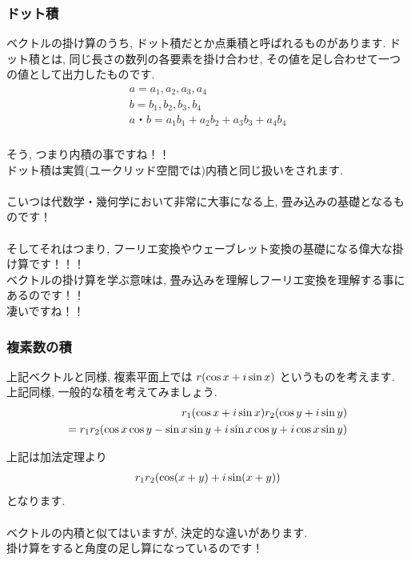 \documentclass[11pt,a4paper]{jreport}
\begin{document}
\subsubsection{ドット積}
ベクトルの掛け算のうち, ドット積だとか点乗積と呼ばれるものがあります.
ドット積とは, 同じ長さの数列の各要素を掛け合わせ, その値を足し合わせて一つの値として出力したものです.\\
\begin{eqnarray}
\begin{split}
a = {a_1,a_2,a_3,a_4}\\
b={b_1,b_2,b_3,b_4}\\
a・b = a_1b_1 + a_2b_2 + a_3b_3 + a_4b_4
\end{split}
\end{eqnarray}
\\
そう, つまり内積の事ですね！！\\
ドット積は実質(ユークリッド空間では)内積と同じ扱いをされます.\\
\\
こいつは代数学・幾何学において非常に大事になる上, 畳み込みの基礎となるものです！\\
\\
そしてそれはつまり, フーリエ変換やウェーブレット変換の基礎になる偉大な掛け算です！！！
\\
ベクトルの掛け算を学ぶ意味は, 畳み込みを理解しフーリエ変換を理解する事にあるのです！！\\
凄いですね！！\\

\subsubsection{複素数の積}
上記ベクトルと同様, 複素平面上では $\mathstrut r (\cos x + \mathstrut i\sin x)$ というものを考えます.\\
上記同様, 一般的な積を考えてみましょう.\\

\begin{eqnarray}
\begin{split}
\mathstrut r_1(\cos x + \mathstrut i\sin x)\mathstrut r_2(\cos y + \mathstrut i\sin y)\\
= \mathstrut r_1\mathstrut r_2(\cos x\cos y - \sin x\sin y + \mathstrut i\sin x \cos y + \mathstrut i\cos x\sin y)
\end{split}
\end{eqnarray}

上記は加法定理より
\begin{eqnarray}
\mathstrut r_1\mathstrut r_2(\cos (\mathstrut x + \mathstrut y) + \mathstrut i\sin (\mathstrut x + \mathstrut y))
\end{eqnarray}
となります.\\
\\
ベクトルの内積と似てはいますが, 決定的な違いがあります.\\
掛け算をすると角度の足し算になっているのです！\\
\end{document}
